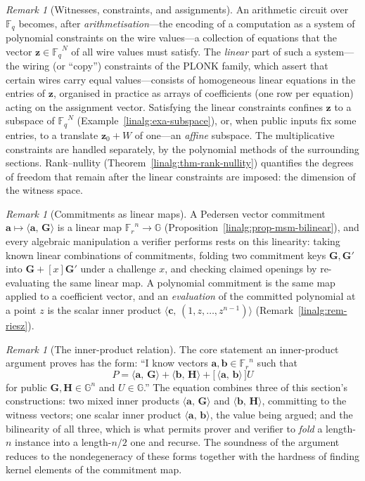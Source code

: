 \documentclass[11pt,a4paper]{article}
\theoremstyle{definition}
\theoremstyle{remark}
\newtheorem{remark}[theorem]{Remark}
\newcommand{\G}{\ensuremath{\mathbb{G}}}
\newcommand{\Fq}{\ensuremath{\mathbb{F}_{q}}}
\newcommand{\ip}[2]{\langle #1,\, #2 \rangle}
\newcommand{\Fr}{\ensuremath{\mathbb{F}_{r}}}
\begin{document}
\begin{remark}[Witnesses, constraints, and
assignments]\label{linalg:rem-constraints}
An arithmetic circuit over \(\Fq\) becomes, after
\emph{arithmetisation}---the encoding of a computation as a system of
polynomial constraints on the wire values---a collection of equations
that the vector \(\mathbf z \in \Fq^N\) of all wire values must
satisfy. The \emph{linear} part of such a system---the wiring (or
``copy'') constraints of the PLONK family, which assert that certain
wires carry equal values---consists of homogeneous linear equations in
the entries of \(\mathbf z\), organised in practice as arrays of
coefficients (one row per equation) acting on the assignment vector.
Satisfying the linear constraints confines \(\mathbf z\) to a subspace
of \(\Fq^N\) (Example~\ref{linalg:exa-subspace}), or, when public
inputs fix some entries, to a translate \(\mathbf z_0 + W\) of one---an
\emph{affine} subspace. The multiplicative constraints are handled
separately, by the polynomial methods of the surrounding sections.
Rank--nullity (Theorem~\ref{linalg:thm-rank-nullity}) quantifies the
degrees of freedom that remain after the linear constraints are
imposed: the dimension of the witness space.
\end{remark}

\begin{remark}[Commitments as linear maps]\label{linalg:rem-commit-linear}
A Pedersen vector commitment
\(\mathbf a \mapsto \ip{\mathbf a}{\mathbf G}\) is a linear map
\(\Fr^n \to \G\) (Proposition~\ref{linalg:prop-msm-bilinear}), and
every algebraic manipulation a verifier performs rests on this
linearity: taking known linear combinations of commitments, folding two
commitment keys \(\mathbf G, \mathbf G'\) into
\(\mathbf G + [x]\mathbf G'\) under a challenge \(x\), and checking
claimed openings by re-evaluating the same linear map. A polynomial
commitment is the same map applied to a coefficient vector, and an
\emph{evaluation} of the committed polynomial at a point \(z\) is the
scalar inner product \(\ip{\mathbf c}{(1, z, \dots, z^{n-1})}\)
(Remark~\ref{linalg:rem-riesz}).
\end{remark}

\begin{remark}[The inner-product relation]\label{linalg:rem-ipa}
The core statement an inner-product argument proves has the form:
``I know vectors \(\mathbf a, \mathbf b \in \Fr^n\) such that
\[
P = \ip{\mathbf a}{\mathbf G} + \ip{\mathbf b}{\mathbf H}
+ \bigl[\, \ip{\mathbf a}{\mathbf b} \,\bigr] U
\]
for public \(\mathbf G, \mathbf H \in \G^n\) and \(U \in \G\).'' The
equation combines three of this section's constructions: two mixed
inner products \(\ip{\mathbf a}{\mathbf G}\) and
\(\ip{\mathbf b}{\mathbf H}\), committing to the witness vectors; one
scalar inner product \(\ip{\mathbf a}{\mathbf b}\), the value being
argued; and the bilinearity of all three, which is what permits prover
and verifier to \emph{fold} a length-\(n\) instance into a
length-\(n/2\) one and recurse. The soundness of the argument reduces to
the nondegeneracy of these forms together with the hardness of finding
kernel elements of the commitment map.
\end{remark}
\end{document}
